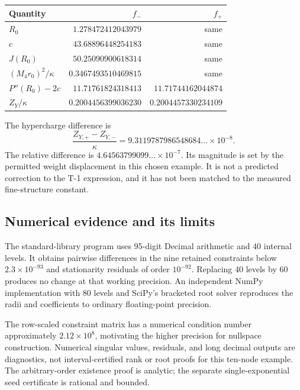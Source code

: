 \documentclass[11pt,letterpaper]{article}
\begin{document}
\begin{center}
\small
\begin{tabular}{@{}lrr@{}}
\toprule
Quantity & $f_-$ & $f_+$\\
\midrule
$R_0$ & $1.278472412043979$ & same\\
$c$ & $43.68896448254183$ & same\\
$J(R_0)$ & $50.25090900618314$ & same\\
$(M_4r_0)^2/\kappa$ & $0.3467493510469815$ & same\\
$P''(R_0)-2c$ & $11.71761824318413$ & $11.71744162044874$\\
$Z_Y/\kappa$ & $0.2004456399036230$ & $0.2004457330234109$\\
\bottomrule
\end{tabular}
\end{center}

The hypercharge difference is
\begin{equation}
 \boxed{\frac{Z_{Y,+}-Z_{Y,-}}{\kappa}
 =9.3119787986548684\ldots\times10^{-8}.}
\end{equation}
The relative difference is $4.64563799099\ldots\times10^{-7}$. Its magnitude is set by the permitted weight displacement in this chosen example. It is not a predicted correction to the T-1 expression, and it has not been matched to the measured fine-structure constant.

\subsection{Numerical evidence and its limits}
The standard-library program uses 95-digit Decimal arithmetic and 40 internal levels. It obtains pairwise differences in the nine retained constraints below $2.3\times10^{-93}$ and stationarity residuals of order $10^{-92}$. Replacing 40 levels by 60 produces no change at that working precision. An independent NumPy implementation with 80 levels and SciPy's bracketed root solver reproduces the radii and coefficients to ordinary floating-point precision.

The row-scaled constraint matrix has a numerical condition number approximately $2.12\times10^8$, motivating the higher precision for nullspace construction. Numerical singular values, residuals, and long decimal outputs are diagnostics, not interval-certified rank or root proofs for this ten-node example. The arbitrary-order existence proof is analytic; the separate single-exponential seed certificate is rational and bounded.
\end{document}
